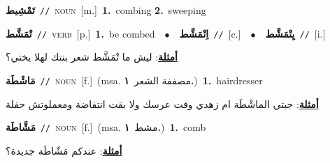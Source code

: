 \documentclass[10pt,a4paper,twoside]{article} %
\begin{document}
\begin{multicols}{2}
{\setlength\topsep{0pt}\textbf{\foreignlanguage{arabic}{تَمْشِيط}}\ {\color{gray}\texttt{//}\color{black}}\ \textsc{noun}\ [m.]\ \textbf{1.}~combing  \textbf{2.}~sweeping\ } \vspace{2mm}

{\setlength\topsep{0pt}\textbf{\foreignlanguage{arabic}{تْمَشَّط}}\ {\color{gray}\texttt{//}\color{black}}\ \textsc{verb}\ [p.]\ \textbf{1.}~be combed\ \ $\bullet$\ \ \setlength\topsep{0pt}\textbf{\foreignlanguage{arabic}{اِتْمَشَّط}}\ {\color{gray}\texttt{//}\color{black}}\ [c.]\ \ $\bullet$\ \ \setlength\topsep{0pt}\textbf{\foreignlanguage{arabic}{يِتْمَشَّط}}\ {\color{gray}\texttt{//}\color{black}}\ [i.]\  \begin{flushright}\color{gray}\foreignlanguage{arabic}{\textbf{\underline{\foreignlanguage{arabic}{أمثلة}}}: ليش ما تْمَشَّط شعر بنتك لهلا يختي؟}\end{flushright}\color{black}} \vspace{2mm}

{\setlength\topsep{0pt}\textbf{\foreignlanguage{arabic}{مَاشْطَة}}\ {\color{gray}\texttt{//}\color{black}}\ \textsc{noun}\ [f.]\ \color{gray}(msa. \foreignlanguage{arabic}{مصففة الشعر}~\foreignlanguage{arabic}{\textbf{١.}})\color{black}\ \textbf{1.}~hairdresser\  \begin{flushright}\color{gray}\foreignlanguage{arabic}{\textbf{\underline{\foreignlanguage{arabic}{أمثلة}}}: جبتي الماشْطَة ام زهدي وقت عرسك ولا بقت انتفاضة ومعملوتش حفلة}\end{flushright}\color{black}} \vspace{2mm}

{\setlength\topsep{0pt}\textbf{\foreignlanguage{arabic}{مَشَّاطَة}}\ {\color{gray}\texttt{//}\color{black}}\ \textsc{noun}\ [f.]\ \color{gray}(msa. \foreignlanguage{arabic}{مشط}~\foreignlanguage{arabic}{\textbf{١.}})\color{black}\ \textbf{1.}~comb\  \begin{flushright}\color{gray}\foreignlanguage{arabic}{\textbf{\underline{\foreignlanguage{arabic}{أمثلة}}}: عندكم مَشّاطَة جديدة؟}\end{flushright}\color{black}} \vspace{2mm}


\end{multicols}
\end{document}
